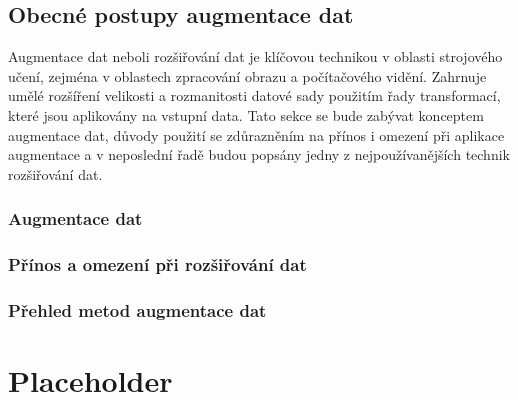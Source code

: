 \documentclass[male,czech,api_ing]{thesis}
\begin{document}
\section{Obecné postupy augmentace dat}
Augmentace dat neboli rozšiřování dat je klíčovou technikou v oblasti strojového učení, zejména v oblastech zpracování obrazu a počítačového vidění. Zahrnuje umělé rozšíření velikosti a rozmanitosti datové sady použitím řady transformací, které jsou aplikovány na vstupní data. Tato sekce se bude zabývat konceptem augmentace dat, důvody použití se zdůrazněním na přínos i omezení při aplikace augmentace a v neposlední řadě budou popsány jedny z nejpoužívanějších technik rozšiřování dat.

\subsection{Augmentace dat}

\subsection{Přínos a omezení při rozšiřování dat}

\subsection{Přehled metod augmentace dat}


\chapter{Placeholder}





\end{document}

